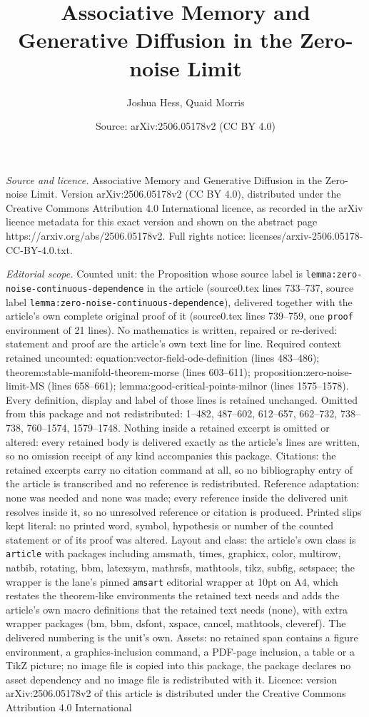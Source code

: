 \documentclass[10pt,a4paper]{amsart}
\title[Associative Memory and Generative Diffusion in the Zero-nois]{Associative Memory and Generative Diffusion in the Zero-noise Limit}
\author{Joshua Hess, Quaid Morris}
\date{Source: arXiv:2506.05178v2 (CC BY 4.0)}
\begin{document}
\maketitle

\noindent\emph{Source and licence.} Associative Memory and Generative Diffusion in the Zero-noise Limit. Version arXiv:2506.05178v2 (CC BY 4.0), distributed under the Creative Commons Attribution 4.0 International licence, as recorded in the arXiv licence metadata for this exact version and shown on the abstract page https://arxiv.org/abs/2506.05178v2. Full rights notice: licenses/arxiv-2506.05178-CC-BY-4.0.txt.\par\smallskip

\noindent\textit{Editorial scope.} Counted unit: the Proposition whose source label is \texttt{lemma:zero-noise-continuous-dependence} in the article (source0.tex lines 733--737, source label \texttt{lemma:zero-noise-continuous-dependence}), delivered together with the article's own complete original proof of it (source0.tex lines 739--759, one \texttt{proof} environment of 21 lines). No mathematics is written, repaired or re-derived: statement and proof are the article's own text line for line. Required context retained uncounted: equation:vector-field-ode-definition (lines 483--486); theorem:stable-manifold-theorem-morse (lines 603--611); proposition:zero-noise-limit-MS (lines 658--661); lemma:good-critical-points-milnor (lines 1575--1578). Every definition, display and label of those lines is retained unchanged. Omitted from this package and not redistributed: 1--482, 487--602, 612--657, 662--732, 738--738, 760--1574, 1579--1748. Nothing inside a retained excerpt is omitted or altered: every retained body is delivered exactly as the article's lines are written, so no omission receipt of any kind accompanies this package. Citations: the retained excerpts carry no citation command at all, so no bibliography entry of the article is transcribed and no reference is redistributed. Reference adaptation: none was needed and none was made; every reference inside the delivered unit resolves inside it, so no unresolved reference or citation is produced. Printed slips kept literal: no printed word, symbol, hypothesis or number of the counted statement or of its proof was altered. Layout and class: the article's own class is \texttt{article} with packages including amsmath, times, graphicx, color, multirow, natbib, rotating, bbm, latexsym, mathrsfs, mathtools, tikz, subfig, setspace; the wrapper is the lane's pinned \texttt{amsart} editorial wrapper at 10pt on A4, which restates the theorem-like environments the retained text needs and adds the article's own macro definitions that the retained text needs (none), with extra wrapper packages (bm, bbm, dsfont, xspace, cancel, mathtools, cleveref). The delivered numbering is the unit's own. Assets: no retained span contains a figure environment, a graphics-inclusion command, a PDF-page inclusion, a table or a TikZ picture; no image file is copied into this package, the package declares no asset dependency and no image file is redistributed with it. Licence: version arXiv:2506.05178v2 of this article is distributed under the Creative Commons Attribution 4.0 International 
\end{document}
